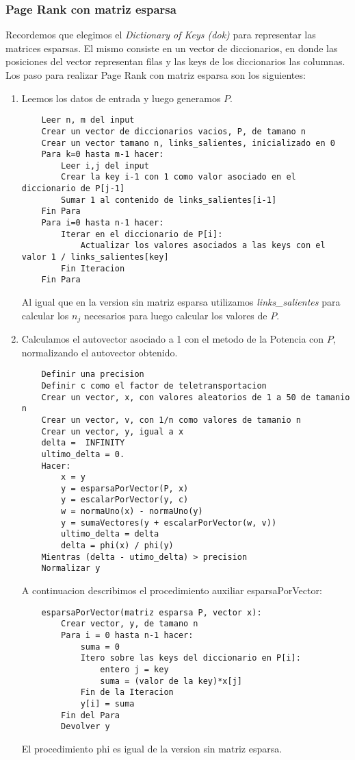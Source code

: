 \subsubsection{Page Rank con matriz esparsa}\label{imp_esparsa}
Recordemos que elegimos el \textit{Dictionary of Keys (dok)} para representar las matrices esparsas. El mismo consiste en un vector de diccionarios, en donde las posiciones del vector representan filas y las keys de los diccionarios las columnas.
Los paso para realizar Page Rank con matriz esparsa son los siguientes:
\begin{enumerate}
	\item Leemos los datos de entrada y luego generamos $P$.
	\begin{lstlisting}
	Leer n, m del input
	Crear un vector de diccionarios vacios, P, de tamano n
	Crear un vector tamano n, links_salientes, inicializado en 0
	Para k=0 hasta m-1 hacer:
		Leer i,j del input
		Crear la key i-1 con 1 como valor asociado en el diccionario de P[j-1]
		Sumar 1 al contenido de links_salientes[i-1]
	Fin Para
	Para i=0 hasta n-1 hacer:
		Iterar en el diccionario de P[i]:
			Actualizar los valores asociados a las keys con el valor 1 / links_salientes[key]
		Fin Iteracion
	Fin Para
	\end{lstlisting}
	Al igual que en la version sin matriz esparsa utilizamos \textit{links_salientes} para calcular los $n_j$ necesarios para luego calcular los valores de $P$.

	\item Calculamos el autovector asociado a 1 con el metodo de la Potencia con $P$, normalizando el autovector obtenido.
	\begin{lstlisting}
	Definir una precision
	Definir c como el factor de teletransportacion
	Crear un vector, x, con valores aleatorios de 1 a 50 de tamanio n
	Crear un vector, v, con 1/n como valores de tamanio n
	Crear un vector, y, igual a x
	delta =  INFINITY
	ultimo_delta = 0.
	Hacer:
		x = y
		y = esparsaPorVector(P, x)
		y = escalarPorVector(y, c)
		w = normaUno(x) - normaUno(y)
		y = sumaVectores(y + escalarPorVector(w, v))
		ultimo_delta = delta
		delta = phi(x) / phi(y)
	Mientras (delta - utimo_delta) > precision
	Normalizar y
	\end{lstlisting}
	A continuacion describimos el procedimiento auxiliar esparsaPorVector:
	\begin{lstlisting}
	esparsaPorVector(matriz esparsa P, vector x):
		Crear vector, y, de tamano n
		Para i = 0 hasta n-1 hacer:
			suma = 0
			Itero sobre las keys del diccionario en P[i]:
				entero j = key
				suma = (valor de la key)*x[j]
			Fin de la Iteracion
			y[i] = suma
		Fin del Para
		Devolver y
	\end{lstlisting}
	El procedimiento phi es igual de la version sin matriz esparsa.


\end{enumerate}
